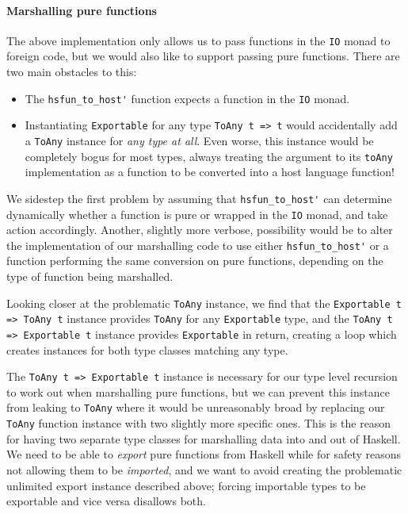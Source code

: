 \documentclass{sigplanconf}
\begin{document}
\paragraph{Marshalling pure functions}
The above implementation only allows us to pass functions in the \lstinline!IO!
monad to foreign code, but we would also like to support passing pure
functions. There are two main obstacles to this:

\begin{itemize}
\item
  The \lstinline!hsfun_to_host'! function expects a function in the
  \lstinline!IO! monad.
\item
  Instantiating \lstinline!Exportable! for any type \lstinline!ToAny t => t!
  would accidentally add a \lstinline!ToAny! instance for
  \emph{any type at all}.
  Even worse, this instance would be completely bogus for most types,
  always treating
  the argument to its \lstinline!toAny! implementation as a function to be
  converted into a host language function!
\end{itemize}

We sidestep the first problem by assuming that \lstinline!hsfun_to_host'!
can determine dynamically whether a function is pure or wrapped in the
\lstinline!IO! monad, and take action accordingly.
Another, slightly more verbose, possibility would be to alter the
implementation of our marshalling code to use either
\lstinline!hsfun_to_host'! or a function performing the same conversion
on pure functions, depending on the type of function being marshalled.

Looking closer at the problematic \lstinline!ToAny! instance, we find that
the \lstinline!Exportable t => ToAny t! instance provides
\lstinline!ToAny! for any
\linebreak
\lstinline!Exportable! type, and the
\lstinline!ToAny t => Exportable t! instance provides \lstinline!Exportable! in
return, creating a loop which creates instances for both type classes
matching any type.

The \lstinline!ToAny t => Exportable t! instance is necessary
for our type level recursion to work out when marshalling pure functions,
but we can prevent this instance from leaking to \lstinline!ToAny! where it
would be unreasonably broad by replacing our \lstinline!ToAny! function
instance with two slightly more specific ones.
This is the reason for having two separate type classes for marshalling
data into and out of Haskell. We need to be able to \emph{export} pure
functions from Haskell while for safety reasons not allowing them to be
\emph{imported}, and we want to avoid creating the problematic unlimited
export instance described above; forcing importable types to be
exportable and vice versa disallows both.
\end{document}
